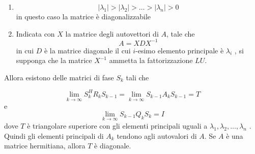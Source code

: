 \begin{theo}[Convergenza]
\begin{enumerate}
\item $$ | \lambda_1| > | \lambda_2 | > \ldots > | \lambda_n | > 0 $$
in questo caso la matrice \`e diagonalizzabile
\item
Indicata con $X$ la matrice degli autovettori di $A$, tale che
\begin{equation}
 \label{eigenvalues:19}
A = XDX ^{-1}
\end{equation}
in cui $D$ \`e la matrice diagonale il cui $i$-esimo elemento principale \`e $\lambda_i$ ,
si supponga che la matrice $X^{-1}$ ammetta la fattorizzazione $LU$.
\end{enumerate}
 Allora
esistono delle matrici di fase $S_k$ tali che

\begin{equation}
 \label{eigenvalues:20}
\lim_{k \to \infty} S_k^{H} R_k S_{k-1} = \lim_{k \to \infty} S_{k-1} A_k S_{k-1} =T
\end{equation}
e
$$\lim_{k \to \infty} S_{k-1} Q_k S_k = I$$
dove $T$ \`e triangolare superiore con gli elementi principali uguali a
$\lambda_1 , \lambda_2 , \ldots,  \lambda_n$ .
 Quindi gli elementi principali di $A_k$ tendono agli autovalori di $A$. Se $A$
\`e una matrice hermitiana, allora $T$ \`e diagonale.
\end{theo}
